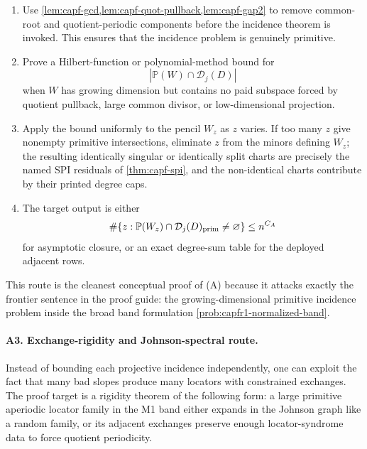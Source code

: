 \documentclass[11pt]{article}
\theoremstyle{definition}
\theoremstyle{remark}
\providecommand{\Dloc}{\mathcal D}
\providecommand{\PP}{\mathbb P}
\begin{document}
\begin{enumerate}[label=\textup{A2.\arabic*},leftmargin=3.0em]
\item Use \cref{lem:capf-gcd,lem:capf-quot-pullback,lem:capf-gap2} to remove common-root and quotient-periodic components before the incidence theorem is invoked.  This ensures that the incidence problem is genuinely primitive.
\item Prove a Hilbert-function or polynomial-method bound for
\[
        |\PP(W)\cap\Dloc_j(D)|
\]
when $W$ has growing dimension but contains no paid subspace forced by quotient pullback, large common divisor, or low-dimensional projection.
\item Apply the bound uniformly to the pencil $W_z$ as $z$ varies.  If too many $z$ give nonempty primitive intersections, eliminate $z$ from the minors defining $W_z$; the resulting identically singular or identically split charts are precisely the named SPI residuals of \cref{thm:capf-spi}, and the non-identical charts contribute by their printed degree caps.
\item The target output is either
\[
        \#\{z:\PP(W_z)\cap\Dloc_j(D)_{\rm prim}\ne\varnothing\}\le n^{C_A}
\]
for asymptotic closure, or an exact degree-sum table for the deployed adjacent rows.
\end{enumerate}

This route is the cleanest conceptual proof of \textup{(A)} because it attacks exactly the frontier sentence in the proof guide: the growing-dimensional primitive incidence problem inside the broad band formulation \cref{prob:capfr1-normalized-band}.

\paragraph{A3. Exchange-rigidity and Johnson-spectral route.}
Instead of bounding each projective incidence independently, one can exploit the fact that many bad slopes produce many locators with constrained exchanges.  The proof target is a rigidity theorem of the following form: a large primitive aperiodic locator family in the M1 band either expands in the Johnson graph like a random family, or its adjacent exchanges preserve enough locator-syndrome data to force quotient periodicity.
\end{document}
